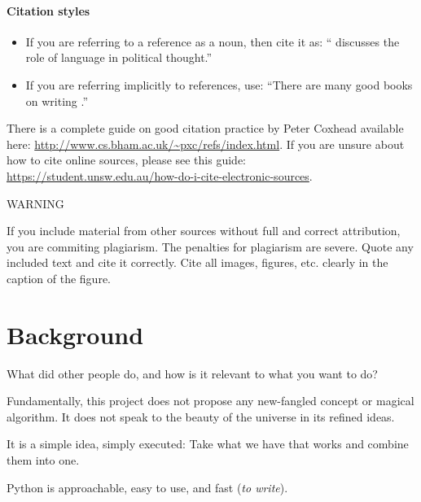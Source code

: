 \documentclass{l4proj}
\begin{document}
\subsubsection{Citation styles}

\begin{itemize}
\item If you are referring to a reference as a noun, then cite it as: ``\citet{Orw68} discusses the role of language in political thought.''
\item If you are referring implicitly to references, use: ``There are many good books on writing \citep{Orw68, Wil09, Pin15}.''
\end{itemize}

There is a complete guide on good citation practice by Peter Coxhead available here: \url{http://www.cs.bham.ac.uk/~pxc/refs/index.html}. 
If you are unsure about how to cite online sources, please see this guide: \url{https://student.unsw.edu.au/how-do-i-cite-electronic-sources}.


\begin{highlight_title}{WARNING}
    
    If you include material from other sources without full and correct attribution, you are commiting plagiarism. The penalties for plagiarism are severe.
    Quote any included text and cite it correctly. Cite all images, figures, etc. clearly in the caption of the figure.
\end{highlight_title}


\chapter{Background}
What did other people do, and how is it relevant to what you want to do?

Fundamentally, this project does not propose any new-fangled concept or magical algorithm.
It does not speak to the beauty of the universe in its refined ideas.

It is a simple idea, simply executed: Take what we have that works and combine them into one.

Python is approachable, easy to use, and fast (\emph{to write}).
\end{document}
